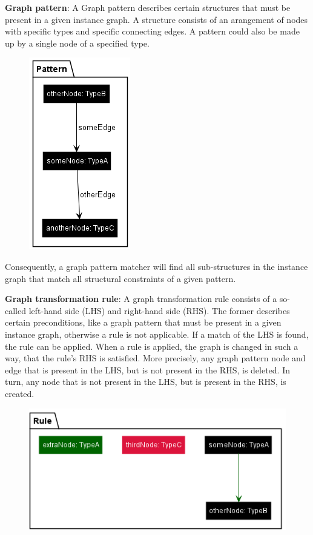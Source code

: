 \textbf{Graph pattern}:\newline
A Graph pattern describes certain structures that must be present in a given instance graph. A structure consists of an arangement of nodes with specific types and specific connecting edges. A pattern could also be made up by a single node of a specified type.\newline
\begin{figure}[h]
    \centering
    \includegraphics[scale=0.7]{pictures/pattern.png}
    \caption{}
    \label{pattern example}
\end{figure}

Consequently, a graph pattern matcher will find all sub-structures in the instance graph that match all structural constraints of a given pattern.\newline
\clearpage

\textbf{Graph transformation rule}:\newline\newline
A graph transformation rule consists of a so-called left-hand side (LHS) and right-hand side (RHS). The former describes certain preconditions, like a graph pattern that must be present in a given instance graph, otherwise a rule is not applicable. If a match of the LHS is found, the rule can be applied. When a rule is applied, the graph is changed in such a way, that the rule's RHS is satisfied. More precisely, any graph pattern node and edge that is present in the LHS, but is not present in the RHS, is deleted. In turn, any node that is not present in the LHS, but is present in the RHS, is created.\newline

\begin{figure}[h]
    \centering
    \includegraphics[scale=0.8]{pictures/rule.png}
    \caption{}
    \label{rule}
\end{figure}

